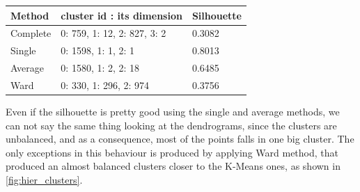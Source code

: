 \begin{table}[H]
\centering
\begin{tabular}{l|l|l}
\textbf{Method}   & \textbf{cluster id : its dimension} & \textbf{Silhouette} \\\hline
Complete & 0: 759, \hspace{2pt} 1: 12, \hspace{2pt} 2: 827, \hspace{2pt} 3: 2 & 0.3082\\
Single   & 0: 1598, 1: 1, \hspace{2pt} \hspace{2pt} 2: 1 & 0.8013 \\
Average  & 0: 1580, 1: 2, \hspace{2pt} \hspace{2pt} 2: 18 & 0.6485 \\
Ward     & 0: 330, \hspace{2pt} 1: 296, 2: 974 & 0.3756 \\\hline  
\end{tabular}
\end{table}
Even if the silhouette is pretty good using the single and average methods, we can not say the same thing looking at the dendrograms, since the clusters are unbalanced, and as a consequence, most of the points falls in one big cluster. The only exceptions in this behaviour is produced by applying Ward method, that produced an almost balanced clusters closer to the K-Means ones, as shown in \autoref{fig:hier_clusters}.

